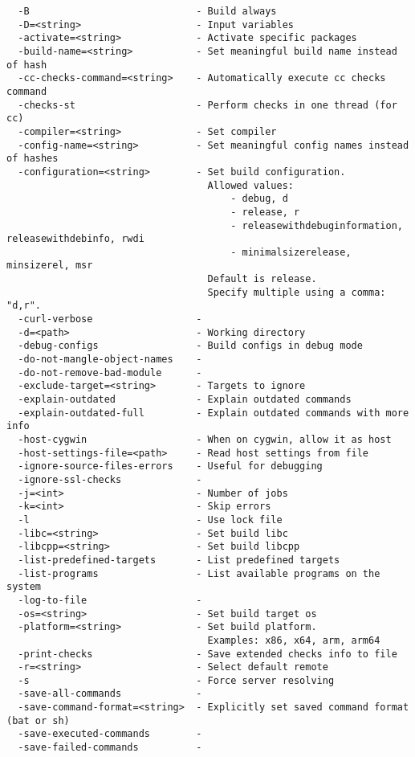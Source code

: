 \begin{verbatim}
  -B                             - Build always
  -D=<string>                    - Input variables
  -activate=<string>             - Activate specific packages
  -build-name=<string>           - Set meaningful build name instead of hash
  -cc-checks-command=<string>    - Automatically execute cc checks command
  -checks-st                     - Perform checks in one thread (for cc)
  -compiler=<string>             - Set compiler
  -config-name=<string>          - Set meaningful config names instead of hashes
  -configuration=<string>        - Set build configuration.
                                   Allowed values:
                                       - debug, d
                                       - release, r
                                       - releasewithdebuginformation, releasewithdebinfo, rwdi
                                       - minimalsizerelease, minsizerel, msr
                                   Default is release.
                                   Specify multiple using a comma: "d,r".
  -curl-verbose                  -
  -d=<path>                      - Working directory
  -debug-configs                 - Build configs in debug mode
  -do-not-mangle-object-names    -
  -do-not-remove-bad-module      -
  -exclude-target=<string>       - Targets to ignore
  -explain-outdated              - Explain outdated commands
  -explain-outdated-full         - Explain outdated commands with more info
  -host-cygwin                   - When on cygwin, allow it as host
  -host-settings-file=<path>     - Read host settings from file
  -ignore-source-files-errors    - Useful for debugging
  -ignore-ssl-checks             -
  -j=<int>                       - Number of jobs
  -k=<int>                       - Skip errors
  -l                             - Use lock file
  -libc=<string>                 - Set build libc
  -libcpp=<string>               - Set build libcpp
  -list-predefined-targets       - List predefined targets
  -list-programs                 - List available programs on the system
  -log-to-file                   -
  -os=<string>                   - Set build target os
  -platform=<string>             - Set build platform.
                                   Examples: x86, x64, arm, arm64
  -print-checks                  - Save extended checks info to file
  -r=<string>                    - Select default remote
  -s                             - Force server resolving
  -save-all-commands             -
  -save-command-format=<string>  - Explicitly set saved command format (bat or sh)
  -save-executed-commands        -
  -save-failed-commands          -

\end{verbatim}

